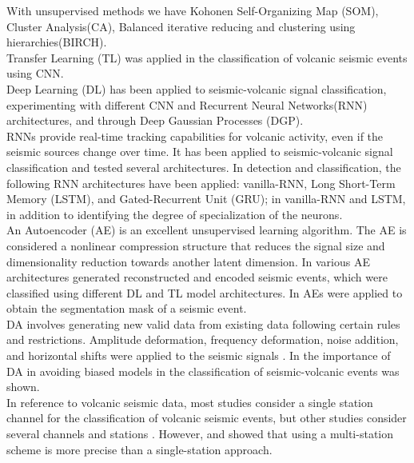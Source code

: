 \documentclass[journal]{IEEEtran}
\begin{document}
With unsupervised methods we have Kohonen Self-Organizing Map (SOM)\cite{langer2009synopsis,esposito2008unsupervised}, Cluster Analysis(CA)\cite{langer2009synopsis}, Balanced iterative reducing and clustering using hierarchies(BIRCH)\cite{duque2020exploring}. \\
Transfer Learning (TL) was applied in the classification of volcanic seismic events using CNN\cite{mythesismaster,titos2019classification}. \\
Deep Learning (DL) has been applied to seismic-volcanic signal classification, experimenting with different CNN\cite{mythesismaster} and Recurrent Neural Networks(RNN) architectures\cite{salazar2020deep,ferreira2023deep,canario2020indepth}, and through Deep Gaussian Processes (DGP)\cite{lopez2020acontribution}. \\
RNNs provide real-time tracking capabilities for volcanic activity, even if the seismic sources change over time. It has been applied to seismic-volcanic signal classification and tested several architectures\cite{salazar2020deep}. In detection and classification, the following RNN architectures have been applied: vanilla-RNN, Long Short-Term Memory (LSTM), and Gated-Recurrent Unit (GRU)\cite{titos2018detection}; in \cite{rodriguez2021bayesian} vanilla-RNN and LSTM, in addition to identifying the degree of specialization of the neurons. \\
An Autoencoder (AE) is an excellent unsupervised learning algorithm. The AE is considered a nonlinear compression structure that reduces the signal size and dimensionality reduction towards another latent dimension. In \cite{mythesismaster} various AE architectures generated reconstructed and encoded seismic events, which were classified using different DL and TL model architectures. In \cite{rodriguez2021bayesian} AEs were applied to obtain the segmentation mask of a seismic event. \\
DA involves generating new valid data from existing data following certain rules and restrictions. Amplitude deformation, frequency deformation, noise addition, and horizontal shifts were applied to the seismic signals \cite{curilem2018using}. In \cite{salazar2022multi} the importance of DA in avoiding biased models in the classification of seismic-volcanic events was shown. \\
In reference to volcanic seismic data, most studies consider a single station channel for the classification of volcanic seismic events, but other studies consider several channels and stations \cite{lara2020automatic,curilem2016pattern,maggi2017implementation,ferreira2023deep}. However, \cite{titos2019classification} and \cite{ferreira2023deep} showed that using a multi-station scheme is more precise than a single-station approach.
\end{document}
